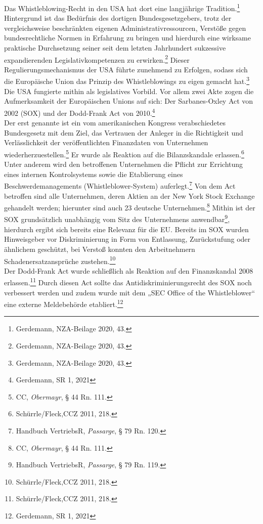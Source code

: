 Das Whistleblowing-Recht in den USA hat dort eine langjährige Tradition.\footnote{Gerdemann, NZA-Beilage 2020, 43.}
Hintergrund ist das Bedürfnis des dortigen Bundesgesetzgebers, trotz der vergleichsweise beschränkten eigenen Administrativressourcen, Verstöße gegen bundesrechtliche Normen in Erfahrung zu bringen und hierdurch eine wirksame praktische Durchsetzung seiner seit dem letzten Jahrhundert sukzessive expandierenden Legislativkompetenzen zu erwirken.\footnote{Gerdemann, NZA-Beilage 2020, 43.}
Dieser Regulierungsmechanismus der USA führte zunehmend zu Erfolgen, sodass sich die Europäische Union das Prinzip des Whistleblowings zu eigen gemacht hat.\footnote{Gerdemann, NZA-Beilage 2020, 43.}
Die USA fungierte mithin als legislatives Vorbild.
Vor allem zwei Akte zogen die Aufmerksamkeit der Europäischen Unions auf sich: Der Sarbanes-Oxley Act von 2002 (SOX) und der Dodd-Frank Act von 2010.\footnote{Gerdemann, SR 1, 2021}\\
Der erst genannte ist ein vom amerikanischen Kongress verabschiedetes Bundesgesetz mit dem Ziel, das Vertrauen der Anleger in die Richtigkeit und Verlässlichkeit der veröffentlichten Finanzdaten von Unternehmen wiederherzuestellen.\footnote{CC, \textit{Obermayr}, § 44 Rn. 111.}
Er wurde als Reaktion auf die Bilanzskandale erlassen.\footnote{Schürrle/Fleck,CCZ 2011, 218.}
Unter anderem wird den betroffenen Unternehmen die Pflicht zur Errichtung eines internen Kontrolsystems sowie die Etablierung eines Beschwerdemanagements (Whistleblower-System) auferlegt.\footnote{Handbuch VertriebsR, \textit{Passarge}, § 79 Rn. 120.}
Von dem Act betroffen sind alle Unternehmen, deren Aktien an der New York Stock Exchange gehandelt werden; hierunter sind auch 23 deutsche Unternehmen.\footnote{CC, \textit{Obermayr}, § 44 Rn. 111.}
Mithin ist der SOX grundsätzlich unabhängig vom Sitz des Unternehmens anwendbar\footnote{Handbuch VertriebsR, \textit{Passarge}, § 79 Rn. 119.}, hierdurch ergibt sich bereits eine Relevanz für die EU.
Bereits im SOX wurden Hinweisgeber vor Diskriminierung in Form von Entlassung, Zurückstufung oder ähnlichem geschützt, bei Verstoß konnten den Arbeitnehmern Schadenersatzansprüche zustehen.\footnote{Schürrle/Fleck,CCZ 2011, 218.}\\
Der Dodd-Frank Act wurde schließlich als Reaktion auf den Finanzskandal 2008 erlassen.\footnote{Schürrle/Fleck,CCZ 2011, 218.}
Durch diesen Act sollte das Antidiskriminierungsrecht des SOX noch verbessert werden und zudem wurde mit dem „SEC Office of the Whistleblower“ eine externe Meldebehörde etabliert.\footnote{Gerdemann, SR 1, 2021}
